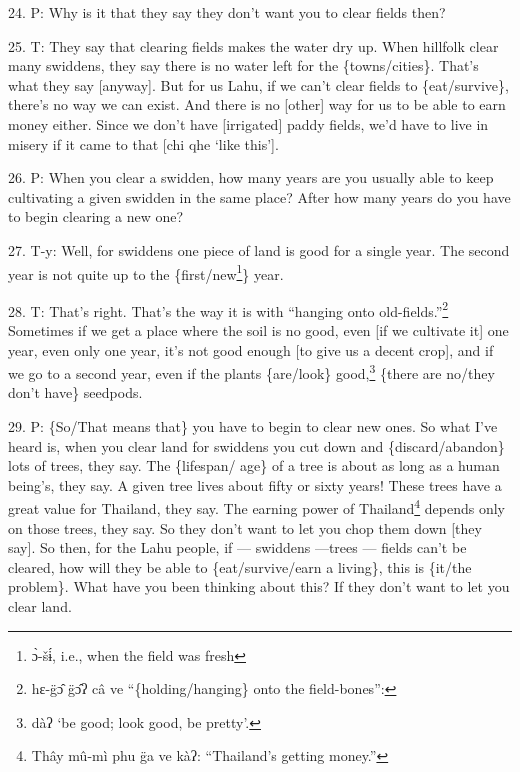 24. P: Why is it that they say they don't want you to clear fields then?

25. T: They say that clearing fields makes the water dry up. When hillfolk clear
many swiddens, they say there is no water left for the \{towns/cities\}. That's
what they say [anyway]. But for us Lahu, if we can't clear fields to \{eat/survive\},
there's no way we can exist. And there is no [other] way for us to be able to earn
money either. Since we don't have [irrigated] paddy fields, we'd have to live in
misery if it came to that [chi qhe `like this'].

26. P: When you clear a swidden, how many years are you usually able to keep cultivating
a given swidden in the same place? After how many years do you have to begin clearing
a new one?

27. T-y: Well, for swiddens one piece of land is good for a single year. The second
year is not quite up to the \{first/new\footnote{ɔ̀-šɨ́, i.e., when the field was fresh}\} year.

28. T: That's right. That's the way it is with ``hanging onto old-fields.''\footnote{hɛ-g̈ɔ̂ g̈ɔ̂ʔ câ ve ``\{holding/hanging\} onto the field-bones'':}
Sometimes if we get a place where the soil is no good, even [if we cultivate it]
one year, even only one year, it's not good enough [to give us a decent crop],
and if we go to a second year, even if the plants \{are/look\} good,\footnote{dàʔ `be good; look good, be pretty'.} \{there
are no/they don't have\} seedpods.

29. P: \{So/That means that\} you have to begin to clear new ones. So what I've
heard is, when you clear land for swiddens you cut down and \{discard/abandon\}
lots of trees, they say. The \{lifespan/ age\} of a tree is about as long as a
human being's, they say. A given tree lives about fifty or sixty years! These trees
have a great value for Thailand, they say. The earning power of Thailand\footnote{Thây mû-mì phu g̈a ve kàʔ: ``Thailand's getting money.''} depends
only on those trees, they say. So they don't want to let you chop them down [they
say]. So then, for the Lahu people, if --- swiddens ---trees --- fields can't be
cleared, how will they be able to \{eat/survive/earn a living\}, this is \{it/the
problem\}. What have you been thinking about this? If they don't want to let you
clear land.

